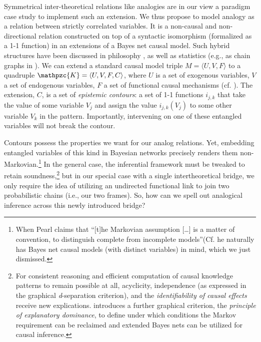 \documentclass[11pt, oneside]{article}   	%
\begin{document}
Symmetrical inter-theoretical relations like analogies are in our view a paradigm case study to implement such an extension.  We thus propose to model analogy as a relation between strictly correlated variables. It is  a non-causal and non-directional relation constructed on top of a syntactic isomorphism (formalized as a 1-1 function) in an extensions of a Bayes net causal model. Such hybrid structures have been discussed in philosophy  \citep{Poellinger2012}, as well as statistics (e.g., as chain graphs in \cite{Lauritzen01}).  We can extend a standard causal model triple $M=\langle U, V, F\rangle$ to a quadruple $\mathpzc{K}=\langle U, V, F, C\rangle$, where $U$ is a set of exogenous variables, $V$ a set of endogenous variables, $F$ a set of functional causal mechanisms (cf.  \cite[def. 7.1.1, p. 203]{Pearl2000}). The extension, $C$, is a set of \emph{epistemic contours}: a set of 1-1 functions $i_{j,k}$ that take the value of some variable $V_j$ and assign the value $i_{j,k}(V_j)$ to some other variable $V_k$ in the pattern. Importantly, intervening on one of these entangled variables will not break the contour.

Contours possess the properties we want for our analog relations. Yet, embedding entangled variables of this kind in Bayesian networks precisely renders them non-Markovian.\footnote{When Pearl claims that ``[t]he Markovian assumption [\dots] is a matter of convention, to distinguish complete from incomplete models''(Cf. \citep[p. 61]{Pearl2000} he naturally has Bayes net causal models (with distinct variables) in mind, which we just dismissed.} In the general case, the inferential framework must be tweaked to retain soundness,\footnote{For consistent reasoning and efficient computation of causal knowledge patterns to remain possible at all, acyclicity, independence (as expressed in the graphical \emph{d}-separation criterion), and the \emph{identifiability of causal effects} receive new explications. \cite{Poellinger2012} introduces a further graphical criterion, the \emph{principle of explanatory dominance}, to define under which conditions the Markov requirement can be reclaimed and extended Bayes nets can be utilized for causal inference.  
} but in our special case with a single intertheoretical bridge, we only require the idea of utilizing an undirected functional link to join two probabilistic chains (i.e., our two frames). So, how can we spell out analogical inference across this newly introduced bridge?
\end{document}
